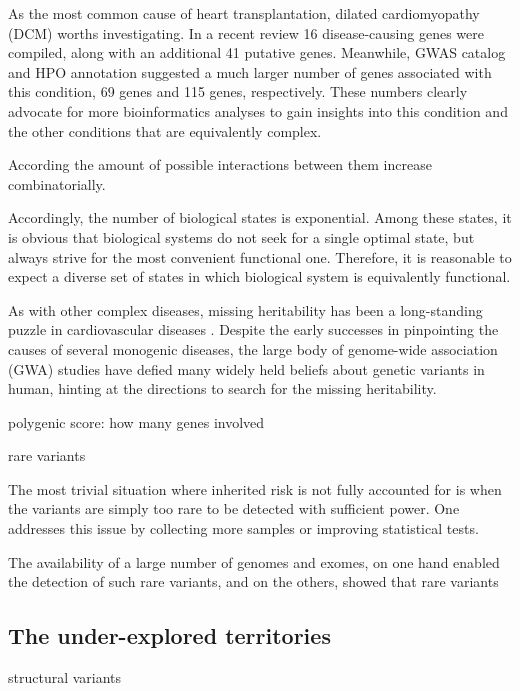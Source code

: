 \documentclass[letter]{bioinfo}
\begin{document}
As the most common cause of heart transplantation, dilated cardiomyopathy (DCM) worths investigating. In a recent review \citep{Burke:2016:Clinical} 16 disease-causing genes were compiled, along with an additional 41 putative genes. Meanwhile, GWAS catalog and HPO annotation suggested a much larger number of genes associated with this condition, 69 genes and 115 genes, respectively. These numbers clearly advocate for more bioinformatics analyses to gain insights into this condition and the other conditions that are equivalently complex.

According the amount of possible interactions between them increase combinatorially.

Accordingly, the number of biological states is exponential. Among these states, it is obvious that biological systems do not seek for a single optimal state, but always strive for the most convenient functional one. Therefore, it is reasonable to expect a diverse set of states in which biological system is equivalently functional.

As with other complex diseases, missing heritability has been a long-standing puzzle in cardiovascular diseases \citep{Manolio:2009:Finding}. Despite the early successes in pinpointing the causes of several monogenic diseases, the large body of genome-wide association (GWA) studies have defied many widely held beliefs about genetic variants in human, hinting at the directions to search for the missing heritability.

polygenic score: how many genes involved




rare variants

The most trivial situation where inherited risk is not fully accounted for is when the variants are simply too rare to be detected with sufficient power. One addresses this issue by collecting more samples or improving statistical tests.

The availability of a large number of genomes and exomes, on one hand enabled the detection of such rare variants, and on the others,  showed that rare variants 


\subsection{The under-explored territories}

structural variants
\end{document}

